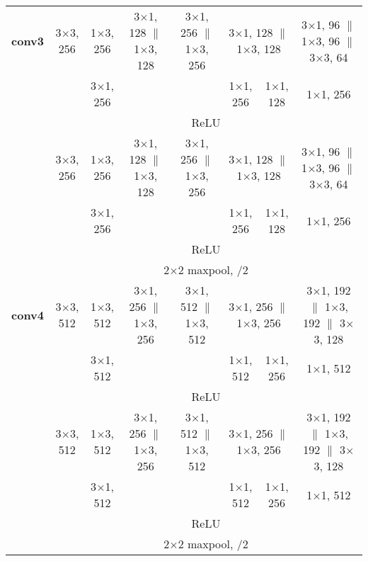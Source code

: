 \documentclass[thesis]{subfiles}
\begin{document}
{\begin{landscape}
{\begin{table*}[p]
\begin{tabular}{@{}|c||c|c|c|c|c|c|c|c|@{}}
	\textbf{conv3} & \multicolumn{2}{c|}{3$\times$3, 256} & 1$\times$3, 256 & 3$\times$1, 128 $\|$ 1$\times$3, 128 & 3$\times$1, 256 $\|$ 1$\times$3, 256 & \multicolumn{2}{c|}{3$\times$1, 128 $\|$ 1$\times$3, 128} & 3$\times$1, 96 $\|$ 1$\times$3, 96 $\|$ 3$\times$3, 64 \\
	\cline{4-4} \cline{7-9}
    & \multicolumn{2}{c|}{} & 3$\times$1, 256 & & & 1$\times$1, 256 & 1$\times$1, 128 & 1$\times$1, 256\\
    \cline{2-9}
	& \multicolumn{8}{c|}{ReLU}\\
    \cline{2-9}
	& \multicolumn{2}{c|}{3$\times$3, 256} & 1$\times$3, 256 & 3$\times$1, 128 $\|$ 1$\times$3, 128 & 3$\times$1, 256 $\|$ 1$\times$3, 256 &\multicolumn{2}{c|}{3$\times$1, 128 $\|$ 1$\times$3, 128} & 3$\times$1, 96 $\|$ 1$\times$3, 96 $\|$ 3$\times$3, 64 \\
	\cline{4-4} \cline{7-9}	
	& \multicolumn{2}{c|}{} & 3$\times$1, 256 & & & 1$\times$1, 256 & 1$\times$1, 128 & 1$\times$1, 256\\
    \cline{2-9}
	& \multicolumn{8}{c|}{ReLU}\\
    \cline{2-9}
	& \multicolumn{8}{c|}{2$\times$2 maxpool, /2}\\
	\hline
	\textbf{conv4} & \multicolumn{2}{c|}{3$\times$3, 512} & 1$\times$3, 512 & 3$\times$1, 256 $\|$ 1$\times$3, 256 & 3$\times$1, 512 $\|$ 1$\times$3, 512 &\multicolumn{2}{c|}{3$\times$1, 256 $\|$ 1$\times$3, 256} & 3$\times$1, 192 $\|$ 1$\times$3, 192 $\|$ 3$\times$3, 128\\
	\cline{4-4} \cline{7-9}
	& \multicolumn{2}{c|}{} & 3$\times$1, 512 & & & 1$\times$1, 512 & 1$\times$1, 256 & 1$\times$1, 512\\
    \cline{2-9}
	& \multicolumn{8}{c|}{ReLU}\\
    \cline{2-9}
	& \multicolumn{2}{c|}{3$\times$3, 512} & 1$\times$3, 512 & 3$\times$1, 256 $\|$ 1$\times$3, 256 & 3$\times$1, 512 $\|$ 1$\times$3, 512 & \multicolumn{2}{c|}{3$\times$1, 256 $\|$ 1$\times$3, 256} & 3$\times$1, 192 $\|$ 1$\times$3, 192 $\|$ 3$\times$3, 128\\
	\cline{4-4} \cline{7-9}
	& \multicolumn{2}{c|}{} & 3$\times$1, 512 & & & 1$\times$1, 512 & 1$\times$1, 256 & 1$\times$1, 512\\
    \cline{2-9}
	& \multicolumn{8}{c|}{ReLU}\\
    \cline{2-9}
	& \multicolumn{8}{c|}{2$\times$2 maxpool, /2}\\
	\hline

\end{tabular}
\end{table*}}
\end{landscape}}
\end{document}
